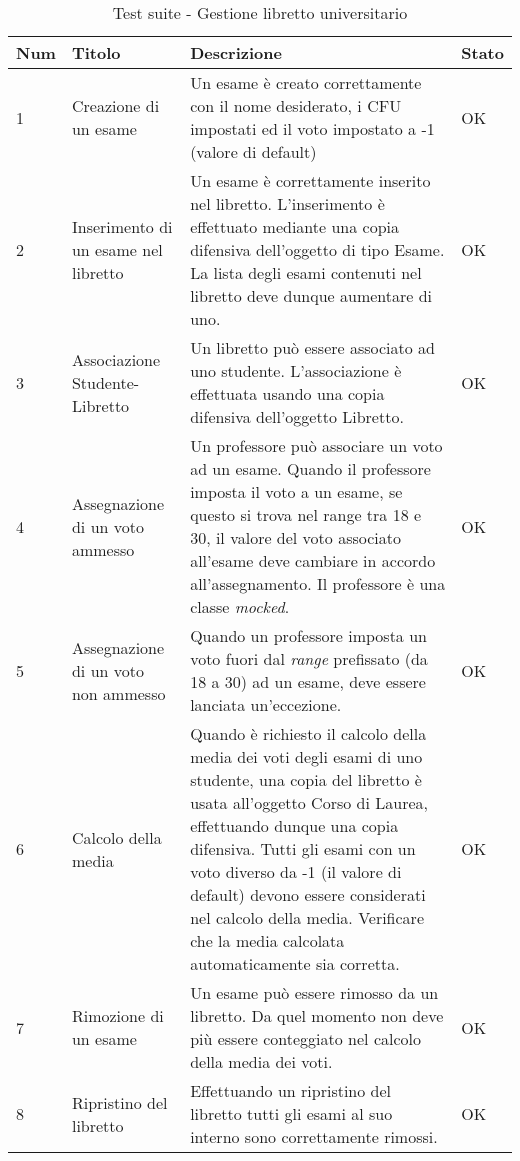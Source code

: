 \begin{table}[h!]
\caption{Test suite - Gestione libretto universitario}
\centering %
\begin{tabular}{|p{1cm}|p{3cm}|p{7cm}|p{1cm}|} %
\hline\hline %
\textbf{Num} & \textbf{Titolo} & \textbf{Descrizione} & \textbf{Stato} \\ [0.5ex] %
\hline %
1 & Creazione di un esame & Un esame è creato correttamente con il nome desiderato, i CFU impostati ed il voto impostato a -1 (valore di default) & OK \\ \hline%
2 & Inserimento di un esame nel libretto & Un esame è correttamente inserito nel libretto. L'inserimento è effettuato mediante una copia difensiva dell'oggetto di tipo Esame. La lista degli esami contenuti nel libretto deve dunque aumentare di uno. & OK \\ \hline
3 & Associazione Studente-Libretto &Un libretto può essere associato ad uno studente. L'associazione è effettuata usando una copia difensiva dell'oggetto Libretto. & OK \\ \hline
4 & Assegnazione di un voto ammesso & Un professore può associare un voto ad un esame. Quando il professore imposta il voto a un esame, se questo si trova nel range tra 18 e 30, il valore del voto associato all'esame deve cambiare in accordo all'assegnamento. Il professore è una classe \emph{mocked}. & OK \\ \hline
5 & Assegnazione di un voto non ammesso & Quando un professore imposta un voto fuori dal \emph{range} prefissato (da 18 a 30) ad un esame, deve essere lanciata un'eccezione.  & OK \\ \hline
6 & Calcolo della media & Quando è richiesto il calcolo della media dei voti degli esami di uno studente, una copia del libretto è usata all'oggetto Corso di Laurea, effettuando dunque una copia difensiva. Tutti gli esami con un voto diverso da -1 (il valore di default) devono essere considerati nel calcolo della media. Verificare che la media calcolata automaticamente sia corretta. & OK \\ \hline
7 & Rimozione di un esame & Un esame può essere rimosso da un libretto. Da quel momento non deve più essere conteggiato nel calcolo della media dei voti. & OK \\ \hline
8 & Ripristino del libretto & Effettuando un ripristino del libretto tutti gli esami al suo interno sono correttamente rimossi. & OK \\ [1ex] %
\hline %
\end{tabular}
\label{table:defensivecopy}
\end{table}


